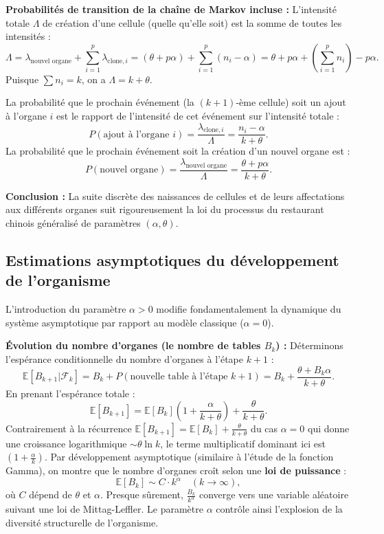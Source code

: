 \documentclass[12pt, a4paper]{article}
\theoremstyle{definition}
\theoremstyle{plain}
\begin{document}
\textbf{Probabilités de transition de la chaîne de Markov incluse :}
L'intensité totale $\Lambda$ de création d'une cellule (quelle qu'elle soit) est la somme de toutes les intensités :
$$ \Lambda = \lambda_{\text{nouvel organe}} + \sum_{i=1}^{p} \lambda_{\text{clone}, i} = (\theta + p\alpha) + \sum_{i=1}^{p} (n_{i} - \alpha) = \theta + p\alpha + \left(\sum_{i=1}^{p} n_{i}\right) - p\alpha. $$
Puisque $\sum n_{i} = k$, on a $\Lambda = k + \theta$.

La probabilité que le prochain événement (la $(k+1)$-ème cellule) soit un ajout à l'organe $i$ est le rapport de l'intensité de cet événement sur l'intensité totale :
$$ P(\text{ajout à l'organe } i) = \frac{\lambda_{\text{clone}, i}}{\Lambda} = \frac{n_{i}-\alpha}{k+\theta}. $$
La probabilité que le prochain événement soit la création d'un nouvel organe est :
$$ P(\text{nouvel organe}) = \frac{\lambda_{\text{nouvel organe}}}{\Lambda} = \frac{\theta+p\alpha}{k+\theta}. $$

\textbf{Conclusion :} La suite discrète des naissances de cellules et de leurs affectations aux différents organes suit rigoureusement la loi du processus du restaurant chinois généralisé de paramètres $(\alpha, \theta)$.

\subsection{Estimations asymptotiques du développement de l'organisme}

L'introduction du paramètre $\alpha > 0$ modifie fondamentalement la dynamique du système asymptotique par rapport au modèle classique ($\alpha=0$).

\textbf{Évolution du nombre d'organes (le nombre de tables $B_{k}$) :}
Déterminons l'espérance conditionnelle du nombre d'organes à l'étape $k+1$ :
$$ \mathbb{E}[B_{k+1} | \mathcal{F}_{k}] = B_{k} + P(\text{nouvelle table à l'étape } k+1) = B_{k} + \frac{\theta+B_{k}\alpha}{k+\theta}. $$
En prenant l'espérance totale :
$$ \mathbb{E}[B_{k+1}] = \mathbb{E}[B_{k}] \left( 1 + \frac{\alpha}{k+\theta} \right) + \frac{\theta}{k+\theta}. $$
Contrairement à la récurrence $\mathbb{E}[B_{k+1}] = \mathbb{E}[B_{k}] + \frac{\theta}{k+\theta}$ du cas $\alpha=0$ qui donne une croissance logarithmique $\sim \theta \ln k$, le terme multiplicatif dominant ici est $\left(1 + \frac{\alpha}{k}\right)$.
Par développement asymptotique (similaire à l'étude de la fonction Gamma), on montre que le nombre d'organes croît selon une \textbf{loi de puissance} :
$$ \mathbb{E}[B_{k}] \sim C \cdot k^{\alpha} \quad (k \rightarrow \infty), $$
où $C$ dépend de $\theta$ et $\alpha$. Presque sûrement, $\frac{B_{k}}{k^{\alpha}}$ converge vers une variable aléatoire suivant une loi de Mittag-Leffler. Le paramètre $\alpha$ contrôle ainsi l'explosion de la diversité structurelle de l'organisme.
\end{document}
